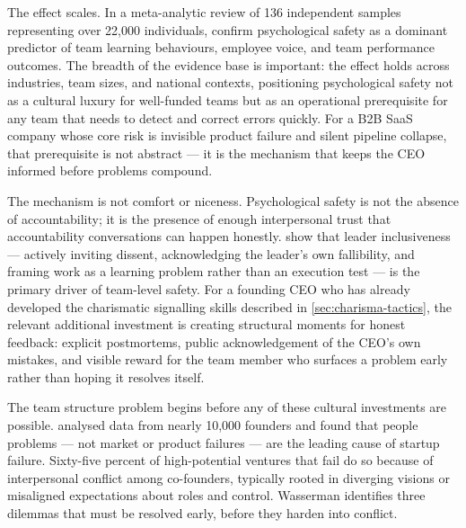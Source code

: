 The effect scales. In a meta-analytic review of \num{136} independent samples representing over
22,000 individuals, \textcite{frazier2017psychsafety} confirm psychological safety as a
dominant predictor of team learning behaviours, employee voice, and team performance outcomes.
The breadth of the evidence base is important: the effect holds across industries, team sizes,
and national contexts, positioning psychological safety not as a cultural luxury for well-funded
teams but as an operational prerequisite for any team that needs to detect and correct errors
quickly. For a B2B SaaS company whose core risk is invisible product failure and silent pipeline
collapse, that prerequisite is not abstract --- it is the mechanism that keeps the CEO informed
before problems compound.

The mechanism is not comfort or niceness. Psychological safety is not the absence of
accountability; it is the presence of enough interpersonal trust that accountability
conversations can happen honestly. \textcite{edmondson1999psychological} show that leader
inclusiveness --- actively inviting dissent, acknowledging the leader's own fallibility, and
framing work as a learning problem rather than an execution test --- is the primary driver of
team-level safety. For a founding CEO who has already developed the charismatic signalling
skills described in \cref{sec:charisma-tactics}, the relevant additional investment is creating
structural moments for honest feedback: explicit postmortems, public acknowledgement of the
CEO's own mistakes, and visible reward for the team member who surfaces a problem early rather
than hoping it resolves itself.

The team structure problem begins before any of these cultural investments are possible.
\textcite{wasserman2012founders} analysed data from nearly 10,000 founders and found that people
problems --- not market or product failures --- are the leading cause of startup failure.
Sixty-five percent of high-potential ventures that fail do so because of interpersonal conflict
among co-founders, typically rooted in diverging visions or misaligned expectations about roles
and control. Wasserman identifies three dilemmas that must be resolved early, before they harden
into conflict.

